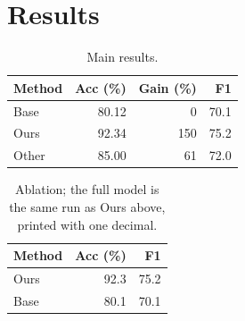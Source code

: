 \documentclass{article}
\begin{document}
\section{Results}
\begin{table}[h]\centering\caption{Main results.}\label{tab:a}
\begin{tabular}{lrrr}
\toprule
Method & Acc (\%) & Gain (\%) & F1 \\
\midrule
Base & 80.12 & 0 & 70.1 \\
Ours & 92.34 & 150 & 75.2 \\
Other & 85.00 & 61 & 72.0 \\
\bottomrule
\end{tabular}\end{table}
\begin{table}[h]\centering\caption{Ablation; the full model is the same run as Ours above, printed with one decimal.}\label{tab:b}
\begin{tabular}{lrr}
\toprule
Method & Acc (\%) & F1 \\
\midrule
Ours & 92.3 & 75.2 \\
Base & 80.1 & 70.1 \\
\bottomrule
\end{tabular}\end{table}
\end{document}
